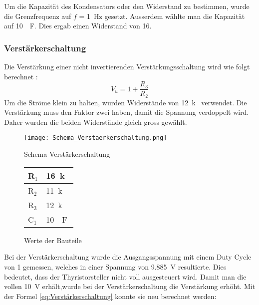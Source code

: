 Um die Kapazität des Kondensators oder den Widerstand zu bestimmen, wurde die Grenzfrequenz auf $f$ = \SI{1}{Hz} gesetzt. Ausserdem wählte man die Kapazität auf \SI{10}{\mu F}. Dies ergab einen Widerstand von \SI{16}{\Omega}. 




\subsubsection*{Verstärkerschaltung}
Die Verstärkung einer nicht invertierenden Verstärkungsschaltung wird wie folgt berechnet \cite{Verstaerker}:
\begin{equation}\label{eq:Verstärkerschaltung}
V_u = 1 + \frac{R_3}{R_2}
\end{equation}
Um die Ströme klein zu halten, wurden Widerstände von \SI{12}{k\Omega} verwendet. Die Verstärkung muss den Faktor zwei haben, damit die Spannung verdoppelt wird. Daher wurden die beiden Widerstände gleich gross gewählt.


\newpage
\begin{figure}[ht!]  
	\centering 
	\begin{minipage}[t]{.76\textwidth} \centering 
		\centering
		\texttt{[image: Schema\_Verstaerkerschaltung.png]}	
		\caption{Schema Verstärkerschaltung}\label{fig:Verstaerkerschaltung}
	\end{minipage}	
	\begin{minipage}[b]{.23\textwidth}
		\centering
		\begin{tabular}{|l|l|}
			\hline
			R$_1$ & \SI{16}{k\Omega} 	\\ 	\hline
			R$_2$ & \SI{11}{k\Omega} 	\\ 	\hline
			R$_3$ & \SI{12}{k\Omega} 	\\	\hline
			C$_1$ & \SI{10}{\mu F} 		\\	\hline
		\end{tabular}
		\caption{Werte der Bauteile}
		\label{tab:Verstaerkerschaltung}
	\end{minipage}
\end{figure} 



Bei der Verstärkerschaltung wurde die Ausgangsspannung mit einem Duty Cycle von 1 gemessen, welches in einer Spannung von \SI{9.885}{V} resultierte. Dies bedeutet, dass der Thyristorsteller nicht voll ausgesteuert wird. Damit man die vollen \SI{10}{V} erhält,wurde bei der Verstärkerschaltung die Verstärkung erhöht. Mit der Formel \ref{eq:Verstärkerschaltung} konnte sie neu berechnet werden:

